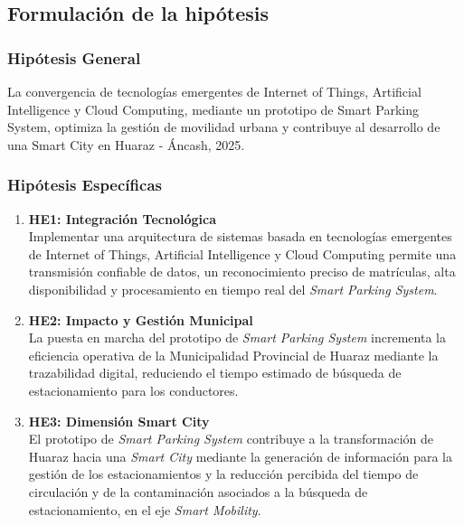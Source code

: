 \documentclass[12pt,a4paper]{article}
\begin{document}
\subsection{Formulación de la hipótesis}
\newcommand{\hipotesisGeneral}{La convergencia de tecnologías emergentes de Internet of Things, Artificial Intelligence y Cloud Computing, mediante un prototipo de Smart Parking System, optimiza la gestión de movilidad urbana y contribuye al desarrollo de una Smart City en Huaraz - Áncash, 2025.}

\newcommand{\hipotesisEspecificoUno}{Implementar una arquitectura de sistemas basada en tecnologías emergentes de Internet of Things, Artificial Intelligence y Cloud Computing permite una transmisión confiable de datos, un reconocimiento preciso de matrículas, alta disponibilidad y procesamiento en tiempo real del \textit{Smart Parking System}.}

\newcommand{\hipotesisEspecificoDos}{La puesta en marcha del prototipo de \textit{Smart Parking System} incrementa la eficiencia operativa de la Municipalidad Provincial de Huaraz mediante la trazabilidad digital, reduciendo el tiempo estimado de búsqueda de estacionamiento para los conductores.}

\newcommand{\hipotesisEspecificoTres}{El prototipo de \textit{Smart Parking System} contribuye a la transformación de Huaraz hacia una \textit{Smart City} mediante la generación de información para la gestión de los estacionamientos y la reducción percibida del tiempo de circulación y de la contaminación asociados a la búsqueda de estacionamiento, en el eje \textit{Smart Mobility}.}

\subsubsection{Hipótesis General}
\hipotesisGeneral{}

\subsubsection{Hipótesis Específicas}
\begin{enumerate}
	\item \textbf{HE1: Integración Tecnológica}\\
	\hipotesisEspecificoUno{}
	
	\item \textbf{HE2: Impacto y Gestión Municipal}\\
	\hipotesisEspecificoDos{}
	
	\item \textbf{HE3: Dimensión Smart City}\\
	\hipotesisEspecificoTres{}
\end{enumerate}
\end{document}
